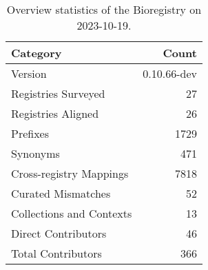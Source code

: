 \begin{table}
\caption{Overview statistics of the Bioregistry on 2023-10-19.}
\label{tab:bioregistry-summary}
\begin{tabular}{lr}
\toprule
Category & Count \\
\midrule
Version & 0.10.66-dev \\
Registries Surveyed & 27 \\
Registries Aligned & 26 \\
Prefixes & 1729 \\
Synonyms & 471 \\
Cross-registry Mappings & 7818 \\
Curated Mismatches & 52 \\
Collections and Contexts & 13 \\
Direct Contributors & 46 \\
Total Contributors & 366 \\
\bottomrule
\end{tabular}
\end{table}
